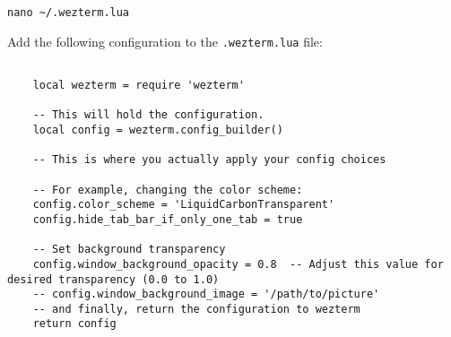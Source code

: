 \begin{lstlisting}
nano ~/.wezterm.lua
\end{lstlisting}


Add the following configuration to the \texttt{.wezterm.lua} file:

\begin{lstlisting}

    local wezterm = require 'wezterm'

    -- This will hold the configuration.
    local config = wezterm.config_builder()
    
    -- This is where you actually apply your config choices
    
    -- For example, changing the color scheme:
    config.color_scheme = 'LiquidCarbonTransparent'
    config.hide_tab_bar_if_only_one_tab = true
    
    -- Set background transparency
    config.window_background_opacity = 0.8  -- Adjust this value for desired transparency (0.0 to 1.0)
    -- config.window_background_image = '/path/to/picture'
    -- and finally, return the configuration to wezterm
    return config
    
\end{lstlisting}


